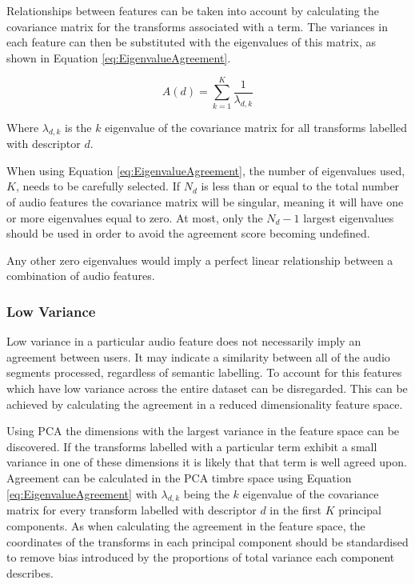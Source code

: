 			Relationships between features can be taken into account by calculating the covariance matrix for
			the transforms associated with a term. The variances in each feature can then be substituted with
			the eigenvalues of this matrix, as shown in Equation \ref{eq:EigenvalueAgreement}.

			\begin{equation}
				A(d) = \sum_{k = 1}^{K} \frac{1}{\lambda_{d,k}}
				\label{eq:EigenvalueAgreement}
			\end{equation}
			
			Where $\lambda_{d, k}$ is the $k$ eigenvalue of the covariance matrix for all transforms
			labelled with descriptor $d$.

			When using Equation \ref{eq:EigenvalueAgreement}, the number of eigenvalues used, $K$, needs to be
			carefully selected. If $N_{d}$ is less than or equal to the total number of audio features the
			covariance matrix will be singular, meaning it will have one or more eigenvalues equal to zero. At
			most, only the $N_{d} - 1$ largest eigenvalues should be used in order to avoid the agreement score
			becoming undefined.

			Any other zero eigenvalues would imply a perfect linear relationship between a combination of audio
			features. 

		\subsubsection*{Low Variance}
			Low variance in a particular audio feature does not necessarily imply an agreement between users.
			It may indicate a similarity between all of the audio segments processed, regardless of semantic
			labelling. To account for this features which have low variance across the entire dataset can be
			disregarded. This can be achieved by calculating the agreement in a reduced dimensionality feature
			space.

			Using PCA the dimensions with the largest variance in the feature space can be discovered. If the
			transforms labelled with a particular term exhibit a small variance in one of these dimensions it
			is likely that that term is well agreed upon. Agreement can be calculated in the PCA timbre space
			using Equation \ref{eq:EigenvalueAgreement} with $\lambda_{d,k}$ being the $k$ eigenvalue
			of the covariance matrix for every transform labelled with descriptor $d$ in the first $K$
			principal components. As when calculating the agreement in the feature space, the coordinates of
			the transforms in each principal component should be standardised to remove bias introduced by the
			proportions of total variance each component describes.

